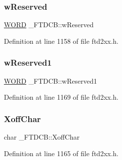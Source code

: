 \mbox{\label{struct__FTDCB_a09597c9223026be01c71a1374715fb2f}} 
\subsubsection{\texorpdfstring{w\+Reserved}{wReserved}}
{\footnotesize\ttfamily \hyperlink{CatCaloProto40MHz_2inc_2WinTypes_8h_a197942eefa7db30960ae396d68339b97}{W\+O\+RD} \+\_\+\+F\+T\+D\+C\+B\+::w\+Reserved}



Definition at line 1158 of file ftd2xx.\+h.

\mbox{\label{struct__FTDCB_a6775b20a593cc63edde243ed9605a028}} 
\subsubsection{\texorpdfstring{w\+Reserved1}{wReserved1}}
{\footnotesize\ttfamily \hyperlink{CatCaloProto40MHz_2inc_2WinTypes_8h_a197942eefa7db30960ae396d68339b97}{W\+O\+RD} \+\_\+\+F\+T\+D\+C\+B\+::w\+Reserved1}



Definition at line 1169 of file ftd2xx.\+h.

\mbox{\label{struct__FTDCB_a30a25a1c40525289b24b29f6593a6c51}} 
\subsubsection{\texorpdfstring{Xoff\+Char}{XoffChar}}
{\footnotesize\ttfamily char \+\_\+\+F\+T\+D\+C\+B\+::\+Xoff\+Char}



Definition at line 1165 of file ftd2xx.\+h.

\mbox{\label{struct__FTDCB_af78536d2734d9172b6707df1d3b1326d}} 
